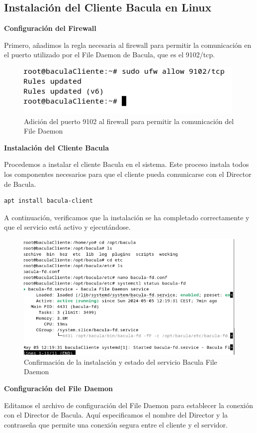 \subsection{Instalación del Cliente Bacula en Linux}

\textbf{Configuración del Firewall}
\medskip

Primero, añadimos la regla necesaria al firewall para permitir la comunicación en el puerto utilizado por el File Daemon de Bacula, que es el 9102/tcp.

\begin{figure}[H]
    \centering
    \includegraphics[width=0.5\linewidth]{instalacionBacula/9102alfirewall.png}
    \caption{Adición del puerto 9102 al firewall para permitir la comunicación del File Daemon}
\end{figure}

\textbf{Instalación del Cliente Bacula}
\medskip

Procedemos a instalar el cliente Bacula en el sistema. Este proceso instala todos los componentes necesarios para que el cliente pueda comunicarse con el Director de Bacula.

\begin{verbatim}
apt install bacula-client
\end{verbatim}

A continuación, verificamos que la instalación se ha completado correctamente y que el servicio está activo y ejecutándose.

\begin{figure}[H]
    \centering
    \includegraphics[width=0.5\linewidth]{instalacionBacula/baculaClienteinstalacion2.png}
    \caption{Confirmación de la instalación y estado del servicio Bacula File Daemon}
\end{figure}

\textbf{Configuración del File Daemon}
\medskip

Editamos el archivo de configuración del File Daemon para establecer la conexión con el Director de Bacula. Aquí especificamos el nombre del Director y la contraseña que permite una conexión segura entre el cliente y el servidor.

